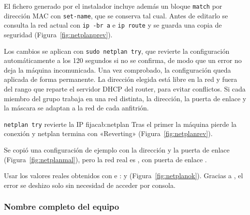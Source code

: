 El fichero generado por el instalador incluye además un bloque \texttt{match} por dirección MAC con \texttt{set-name}, que se conserva tal cual. Antes de editarlo se consulta la red actual con \texttt{ip -br a} e \texttt{ip route} y se guarda una copia de seguridad (Figura~\ref{fig:netplanprev}).


Los cambios se aplican con \texttt{sudo netplan try}, que revierte la configuración automáticamente a los 120 segundos si no se confirma, de modo que un error no deja la máquina incomunicada. Una vez comprobado, la configuración queda aplicada de forma permanente. La dirección elegida está libre en la red y fuera del rango que reparte el servidor DHCP del router, para evitar conflictos. Si cada miembro del grupo trabaja en una red distinta, la dirección, la puerta de enlace y la máscara se adaptan a la red de cada anfitrión.

\begin{cabezazo}{\texttt{netplan try} revierte la IP fija}{cab:netplan}
\problema Tras el primer  la máquina pierde la conexión y
netplan termina con «Reverting» (Figura~\ref{fig:netplanrev}).

\causa Se copió una configuración de ejemplo con la dirección
 y la puerta de enlace 
(Figura~\ref{fig:netplanmal}), pero la red real es , con
puerta de enlace .

\solucion Usar los valores reales obtenidos con  e
:  y 
(Figura~\ref{fig:netplanok}). Gracias a , el error se
deshizo solo sin necesidad de acceder por consola.
\end{cabezazo}


\subsubsection{Nombre completo del equipo}

